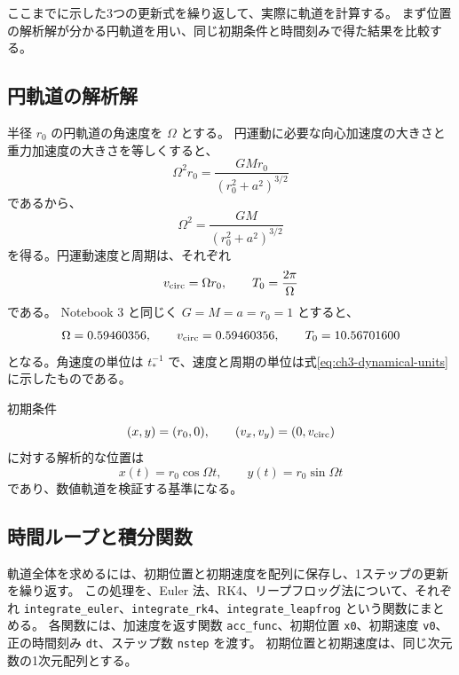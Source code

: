 ここまでに示した3つの更新式を繰り返して、実際に軌道を計算する。
まず位置の解析解が分かる円軌道を用い、同じ初期条件と時間刻みで得た結果を比較する。

\subsection{円軌道の解析解}

半径 $r_0$ の円軌道の角速度を $\Omega$ とする。
円運動に必要な向心加速度の大きさと重力加速度の大きさを等しくすると、
\begin{equation}
 \Omega^2r_0=\frac{GMr_0}{(r_0^2+a^2)^{3/2}}
\end{equation}
であるから、
\begin{equation}
 \Omega^2=\frac{GM}{(r_0^2+a^2)^{3/2}}
\label{eq:ch3-plummer-omega}
\end{equation}
を得る。円運動速度と周期は、それぞれ
\begin{equation}
 v_{\rm circ}=\Omega r_0,\qquad T_0=\frac{2\pi}{\Omega}
\label{eq:ch3-plummer-period}
\end{equation}
である。
Notebook 3 と同じく $G=M=a=r_0=1$ とすると、
\begin{equation}
 \Omega=0.59460356,\qquad
 v_{\rm circ}=0.59460356,\qquad
 T_0=10.56701600
\label{eq:ch3-plummer-numbers}
\end{equation}
となる。角速度の単位は $t_\ast^{-1}$ で、速度と周期の単位は式\eqref{eq:ch3-dynamical-units}に示したものである。

初期条件
\begin{equation}
 (x,y)=(r_0,0),\qquad (v_x,v_y)=(0,v_{\rm circ})
\end{equation}
に対する解析的な位置は
\begin{equation}
 x(t)=r_0\cos\Omega t,\qquad y(t)=r_0\sin\Omega t
\label{eq:ch3-circular-exact}
\end{equation}
であり、数値軌道を検証する基準になる。

\subsection{時間ループと積分関数}

軌道全体を求めるには、初期位置と初期速度を配列に保存し、1ステップの更新を繰り返す。
この処理を、Euler 法、RK4、リープフロッグ法について、それぞれ \texttt{integrate\_euler}、\texttt{integrate\_rk4}、\texttt{integrate\_leapfrog} という関数にまとめる。
各関数には、加速度を返す関数 \texttt{acc\_func}、初期位置 \texttt{x0}、初期速度 \texttt{v0}、正の時間刻み \texttt{dt}、ステップ数 \texttt{nstep} を渡す。
初期位置と初期速度は、同じ次元数の1次元配列とする。

